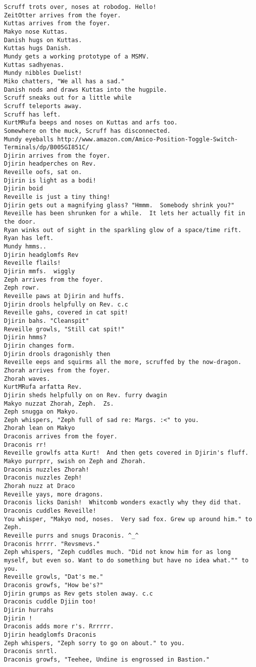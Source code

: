 \begin{verbatim}
Scruff trots over, noses at robodog. Hello!
ZeitOtter arrives from the foyer.
Kuttas arrives from the foyer.
Makyo nose Kuttas.
Danish hugs on Kuttas.
Kuttas hugs Danish.
Mundy gets a working prototype of a MSMV.
Kuttas sadhyenas.
Mundy nibbles Duelist!
Miko chatters, "We all has a sad."
Danish nods and draws Kuttas into the hugpile.
Scruff sneaks out for a little while
Scruff teleports away.
Scruff has left.
KurtMRufa beeps and noses on Kuttas and arfs too.
Somewhere on the muck, Scruff has disconnected.
Mundy eyeballs http://www.amazon.com/Amico-Position-Toggle-Switch-Terminals/dp/B005GI851C/
Djirin arrives from the foyer.
Djirin headperches on Rev.
Reveille oofs, sat on.
Djirin is light as a bodi!
Djirin boid
Reveille is just a tiny thing!
Djirin gets out a magnifying glass? "Hmmm.  Somebody shrink you?"
Reveille has been shrunken for a while.  It lets her actually fit in the door.
Ryan winks out of sight in the sparkling glow of a space/time rift.
Ryan has left.
Mundy hmms..
Djirin headglomfs Rev
Reveille flails!
Djirin mmfs.  wiggly
Zeph arrives from the foyer.
Zeph rowr.
Reveille paws at Djirin and huffs.
Djirin drools helpfully on Rev. c.c
Reveille gahs, covered in cat spit!
Djirin bahs. "Cleanspit"
Reveille growls, "Still cat spit!"
Djirin hmms?
Djirin changes form.
Djirin drools dragonishly then
Reveille eeps and squirms all the more, scruffed by the now-dragon.
Zhorah arrives from the foyer.
Zhorah waves.
KurtMRufa arfatta Rev.
Djirin sheds helpfully on on Rev. furry dwagin
Makyo nuzzat Zhorah, Zeph.  Zs.
Zeph snugga on Makyo.
Zeph whispers, "Zeph full of sad re: Margs. :<" to you.
Zhorah lean on Makyo
Draconis arrives from the foyer.
Draconis rr!
Reveille growlfs atta Kurt!  And then gets covered in Djirin's fluff.
Makyo purrprr, swish on Zeph and Zhorah.
Draconis nuzzles Zhorah!
Draconis nuzzles Zeph!
Zhorah nuzz at Draco
Reveille yays, more dragons.
Draconis licks Danish!  Whitcomb wonders exactly why they did that.
Draconis cuddles Reveille!
You whisper, "Makyo nod, noses.  Very sad fox. Grew up around him." to Zeph.
Reveille purrs and snugs Draconis. ^_^
Draconis hrrrr. "Revsmevs."
Zeph whispers, "Zeph cuddles much. "Did not know him for as long myself, but even so. Want to do something but have no idea what."" to you.
Reveille growls, "Dat's me."
Draconis growfs, "How be's?"
Djirin grumps as Rev gets stolen away. c.c
Draconis cuddle Djiin too!
Djirin hurrahs
Djirin !
Draconis adds more r's. Rrrrrr.
Djirin headglomfs Draconis
Zeph whispers, "Zeph sorry to go on about." to you.
Draconis snrtl.
Draconis growfs, "Teehee, Undine is engrossed in Bastion."

\end{verbatim}
